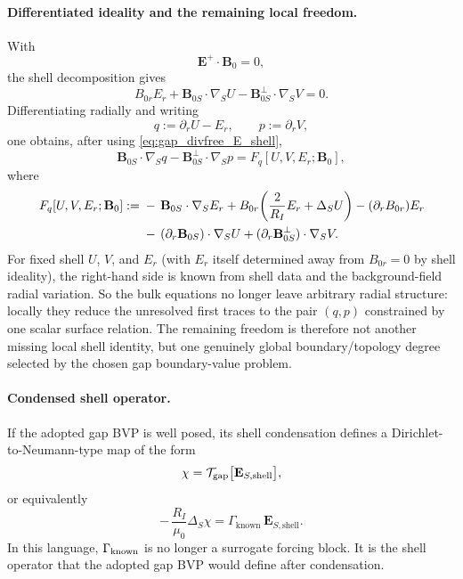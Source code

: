 \documentclass[11pt,a4paper]{article}
\begin{document}
\paragraph{Differentiated ideality and the remaining local freedom.}
With
\[
\mathbf E^+\cdot\mathbf B_0 = 0,
\]
the shell decomposition gives
\[
B_{0r}E_r + \mathbf B_{0S}\cdot\nabla_S U - \mathbf B_{0S}^{\perp}\cdot\nabla_S V = 0.
\]
Differentiating radially and writing
\[
q:=\partial_r U - E_r,
\qquad
p:=\partial_r V,
\]
one obtains, after using \eqref{eq:gap_divfree_E_shell},
\begin{equation}
\mathbf B_{0S}\cdot\nabla_S q
- \mathbf B_{0S}^{\perp}\cdot\nabla_S p
=
F_q[U,V,E_r;\mathbf B_0],
\label{eq:q_p_surface_relation}
\end{equation}
where
\begin{align}
F_q[U,V,E_r;\mathbf B_0]
:={}&
-\,\mathbf B_{0S}\cdot\nabla_S E_r
+ B_{0r}\!\left(\frac{2}{R_I}E_r + \Delta_S U\right)
- (\partial_r B_{0r})E_r
\notag\\
&-\,(\partial_r \mathbf B_{0S})\cdot\nabla_S U
+ (\partial_r \mathbf B_{0S}^{\perp})\cdot\nabla_S V.
\label{eq:q_p_surface_rhs}
\end{align}
For fixed shell \(U\), \(V\), and \(E_r\) (with \(E_r\) itself determined
away from \(B_{0r}=0\) by shell ideality), the right-hand side is known from shell
data and the background-field radial variation. So the bulk equations no
longer leave arbitrary radial structure: locally they reduce the unresolved
first traces to the pair \((q,p)\) constrained by one scalar surface relation.
The remaining freedom is therefore not another missing local shell identity,
but one genuinely global boundary/topology degree selected by the chosen gap
boundary-value problem.

\paragraph{Condensed shell operator.}
If the adopted gap BVP is well posed, its shell condensation defines a
Dirichlet-to-Neumann-type map of the form
\[
\chi = \mathcal T_{\rm gap}\big[\mathbf E_{S,\mathrm{shell}}\big],
\]
or equivalently
\[
-\,\frac{R_I}{\mu_0}\Delta_S\chi
=
\Gamma_{\mathrm{known}}\,\mathbf E_{S,\mathrm{shell}}.
\]
In this language, \(\Gamma_{\rm known}\) is no longer a surrogate forcing
block. It is the shell operator that the adopted gap BVP would define after
condensation.
\end{document}
